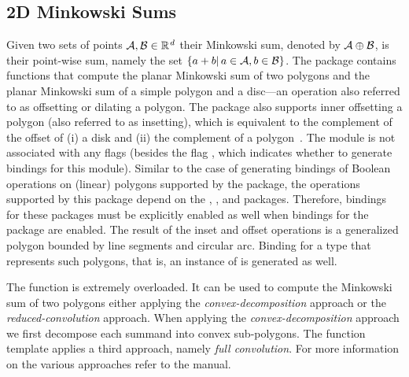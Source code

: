 \subsection{2D Minkowski Sums}
\label{ssec:modules:ms2}
Given two sets of points $\calA, \calB \in \Rd$ their Minkowski sum,
denoted by ${\cal A} \oplus {\cal B}$, is their point-wise sum, namely the
set $\{a+b|\, a \in {\cal A},b \in {\cal B}\}$. The \cgal{} package
\iiDMinkowskiSumsPackage{} contains functions that compute the planar
Minkowski sum of two polygons and the planar Minkowski sum of a
simple polygon and a disc---an operation also referred to as
offsetting or dilating a polygon. The package also supports inner
offsetting a polygon (also referred to as insetting), which is
equivalent to the complement of the offset of (i) a disk and (ii) the
complement of a polygon~\cite{cgal:w-rms2-21a}. The
\iiDMinkowskiSumsPackage{} module is not associated with any \cmake{}
flags (besides the flag ,
which indicates whether to generate bindings for this module).
Similar to the case of generating bindings of Boolean operations on
(linear) polygons supported by the
\iiDRegularizedBooleanSetOperationsPackage{} package, the operations
supported by this package depend on the
\iiDandiiiDGeometryKernelPackage{}, \iiDArrangementsPackage{}, and
\iiDPolygonsPackage{} packages. Therefore, bindings for these packages
must be explicitly enabled as well when bindings for the
\iiDMinkowskiSumsPackage{} package are enabled.  The result of the
inset and offset operations is a generalized polygon bounded by line
segments and circular arc. Binding for a type that represents such
polygons, that is, an instance of
 is generated as
well.

The function  is extremely
overloaded. It can be used to compute the Minkowski sum of two
polygons either applying the \emph{convex-decomposition} approach or
the \emph{reduced-convolution} approach. When applying the
\emph{convex-decomposition} approach we first decompose each summand
into convex sub-polygons. The function template
 applies a
third approach, namely \emph{full convolution}. For more information
on the various approaches refer to the manual.

